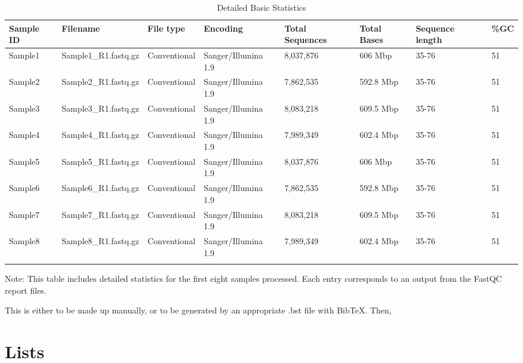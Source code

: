 \documentclass[unnumsec,webpdf,contemporary,large]{oup-authoring-template}%
\theoremstyle{thmstyleone}%
\theoremstyle{thmstyletwo}%
\theoremstyle{thmstylethree}%
\begin{document}
\begin{table}[htbp]
\caption{Detailed Basic Statistics\label{tab2}}
\centering
\begin{tabular}{@{}llllllll@{}}
\toprule
Sample ID & Filename & File type & Encoding & Total Sequences & Total Bases & Sequence length & \%GC \\
\midrule
Sample1 & Sample1\_R1.fastq.gz & Conventional & Sanger/Illumina 1.9 & 8,037,876 & 606 Mbp & 35-76 & 51 \\
Sample2 & Sample2\_R1.fastq.gz & Conventional & Sanger/Illumina 1.9 & 7,862,535 & 592.8 Mbp & 35-76 & 51 \\
Sample3 & Sample3\_R1.fastq.gz & Conventional & Sanger/Illumina 1.9 & 8,083,218 & 609.5 Mbp & 35-76 & 51 \\
Sample4 & Sample4\_R1.fastq.gz & Conventional & Sanger/Illumina 1.9 & 7,989,349 & 602.4 Mbp & 35-76 & 51 \\
Sample5 & Sample5\_R1.fastq.gz & Conventional & Sanger/Illumina 1.9 & 8,037,876 & 606 Mbp & 35-76 & 51 \\
Sample6 & Sample6\_R1.fastq.gz & Conventional & Sanger/Illumina 1.9 & 7,862,535 & 592.8 Mbp & 35-76 & 51 \\
Sample7 & Sample7\_R1.fastq.gz & Conventional & Sanger/Illumina 1.9 & 8,083,218 & 609.5 Mbp & 35-76 & 51 \\
Sample8 & Sample8\_R1.fastq.gz & Conventional & Sanger/Illumina 1.9 & 7,989,349 & 602.4 Mbp & 35-76 & 51 \\
\botrule
\end{tabular}
\begin{tablenotes}%
\item Note: This table includes detailed statistics for the first eight samples processed. Each entry corresponds to an output from the FastQC report files.
\end{tablenotes}
\end{table}


This is either to be made up manually, or to be generated by an
appropriate .bst file with BibTeX. Then,

\section{Lists}\label{sec9}
\end{document}
